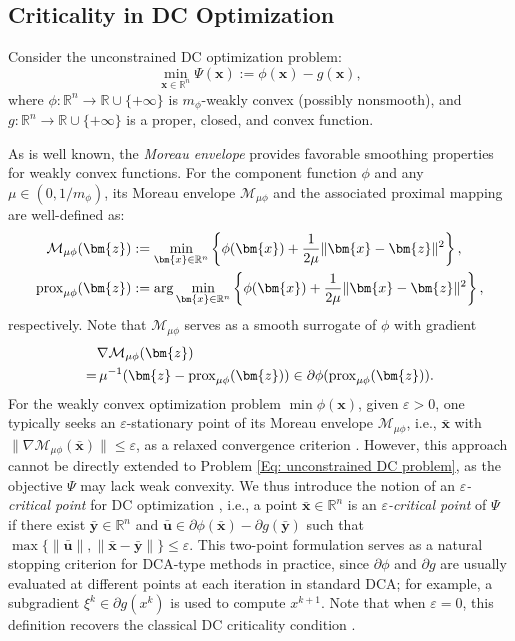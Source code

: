 \documentclass{article}
\theoremstyle{plain}
\theoremstyle{definition}
\theoremstyle{remark}
\newcommand{\RR}{\mathbb{R}}
\newcommand{\prox}{\mathrm{prox}}
\newcommand{\bx}{\bm{x}}
\newcommand{\bu}{\bm{u}}
\newcommand{\bz}{\bm{z}}
\newcommand{\by}{\bm{y}}
\newcommand{\calM}{\mathcal{M}}
\numberwithin{equation}{section}
\begin{document}
\subsection{Criticality in DC Optimization}
Consider the unconstrained DC optimization problem:
\begin{equation}
    \min_{\bx \in \RR^n} \Psi (\bx) := \phi(\bx) - g(\bx),
    \label{Eq: unconstrained DC problem}
\end{equation}
where $\phi: \RR^n \to \RR \cup \{+\infty\}$ is $m_{\phi}$-weakly convex (possibly nonsmooth), and $g: \RR^n \to \RR \cup \{+\infty\}$ is a proper, closed, and convex function.

As is well known, the \textit{Moreau envelope} provides favorable smoothing properties for weakly convex functions. For the component function $\phi$ and any $\mu \in (0, 1/m_{\phi})$, its Moreau envelope $\calM_{\mu\phi}$ and the associated proximal mapping are well-defined as:
\begin{align}
\calM_{\mu\phi}(\bz) &:= \min_{\bx \in \RR^n} \left\{ \phi(\bx) + \frac{1}{2\mu} \| \bx - \bz\|^2 \right\}, \notag \\
\prox_{\mu\phi}(\bz) &:=\arg\min_{\bx \in \RR^n} \left\{ \phi(\bx) + \frac{1}{2\mu} \| \bx - \bz \|^2 \right\}, \label{Eq: the proximal operator}
\end{align}
respectively.
Note that $\calM_{\mu \phi}$ serves as a smooth surrogate of $\phi$ with gradient \citep{Moreau1965}
\begin{align}
         &\nabla \calM_{\mu \phi}(\bz) \notag \\
         =&\, \mu^{-1}(\bz - \prox_{\mu \phi}(\bz)) \in \partial \phi(\prox_{\mu \phi}(\bz)).\label{Eq: the gradient of Moreau envelope}
\end{align}
For the weakly convex optimization problem $\min \phi(\bx)$, given \(\varepsilon > 0\), one typically seeks an $\varepsilon$-stationary point of its Moreau envelope $\calM_{\mu\phi}$, i.e., \(\bar{\bx}\) with \(\| \nabla\calM_{\mu\phi}(\bar{\bx})\| \leq \varepsilon \), as a relaxed convergence criterion \cite{davis2019stochastic}. However, this approach cannot be directly extended to Problem \eqref{Eq: unconstrained DC problem}, as the objective $\Psi$ may lack weak convexity. We thus introduce the notion of an \emph{$\varepsilon$-critical point} for DC optimization \cite{sun2023algorithms}, i.e., a point $\bar{\bx}\in \RR^{n}$ is an \emph{$\varepsilon$-critical point} of $\Psi$ if there exist
$\bar{\by} \in \RR^n$ and $\bar{\bu}\in \partial \phi (\bar{\bx}) - \partial g(\bar{\by})$ such that \(\max \{\|\bar{\bu}\|, \|\bar{\bx}- \bar{\by}\|\} \leq \varepsilon\). This two-point formulation serves as a natural stopping criterion for DCA-type methods in practice, since $\partial \phi$ and $\partial g$ are usually evaluated at different points at each iteration in standard DCA; for example, a subgradient $\xi^k \in \partial g(x^k)$ is used to compute $x^{k+1}$. Note that when \(\varepsilon = 0 \), this definition recovers the classical DC criticality condition \cite{pang2017computing}.
\end{document}
